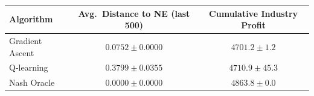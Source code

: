 \begin{tabular}{lcc}
\hline
Algorithm & Avg.\ Distance to NE (last 500) & Cumulative Industry Profit \\
\hline
Gradient Ascent & $0.0752 \pm 0.0000$ & $4701.2 \pm 1.2$ \\
Q-learning & $0.3799 \pm 0.0355$ & $4710.9 \pm 45.3$ \\
Nash Oracle & $0.0000 \pm 0.0000$ & $4863.8 \pm 0.0$ \\
\hline
\end{tabular}
